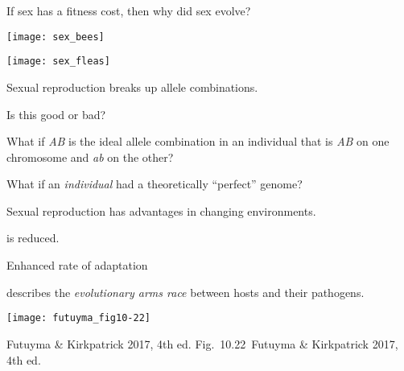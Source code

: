 \documentclass[t]{beamer}
\newcommand{\futuyma}[1]{%
	\ifthenelse{\isempty{#1}}%
	{Futuyma \& Kirkpatrick 2017, 4th ed.}%
	{Fig.~#1~Futuyma \& Kirkpatrick 2017, 4th ed.}%
}
\newcommand{\backskip}{\vspace{-0.5\baselineskip}}
\begin{document}

\begin{frame}{If sex has a fitness cost, then why did sex evolve?}
\vspace{-\baselineskip}

\begin{multicols}{2}

\centering


\smallskip

\texttt{[image: sex\_bees]}

\columnbreak


\smallskip

\texttt{[image: sex\_fleas]}

\end{multicols}
\end{frame}


\begin{frame}{Sexual reproduction breaks up allele combinations.}

\hangpara Is this good or bad?

\hangpara What if \emph{AB} is the ideal allele combination in an individual that is \emph{AB} on one chromosome and \emph{ab} on the other?

\hangpara What if an \emph{individual} had a theoretically “perfect” genome? 


\end{frame}


\begin{frame}{Sexual reproduction has advantages in changing environments.}

\hangpara {}

\hangpara {} is reduced.\newline
	\hspace*{1em} \newline
	\hspace*{1em} 
	
\hangpara Enhanced rate of adaptation

\end{frame}


\begin{frame}{ describes the \emph{evolutionary arms race} between hosts and their pathogens.}

\backskip

\centering


\texttt{[image: futuyma\_fig10-22]}

\tinyfill \futuyma{10.22}


\end{frame}
\end{document}

